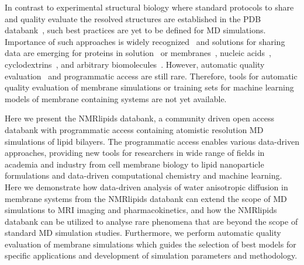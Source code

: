 \documentclass[fleqn,10pt]{wlscirep}
\begin{document}
In contrast to experimental structural biology where standard protocols to share and quality evaluate the resolved structures are established in the PDB databank~\cite{montelione13}, such best practices are yet to be defined for MD simulations. Importance of such approaches is widely recognized~\cite{feig99,tai04,silva06,abraham19,hildebrand19,hospital20,abriata20,espigares20} and solutions for sharing data are emerging for proteins in solution~\cite{meyer10,kamp10} or membranes~\cite{newport19,espigares20,leston22}, nucleic acids~\cite{hospital16}, cyclodextrins~\cite{mixcoha16}, and arbitrary biomolecules~\cite{bekker20}. However,
automatic quality evaluation~\cite{meyer10,hospital16} and programmatic access are still rare. 
Therefore, tools for automatic quality evaluation of membrane simulations or training sets for machine learning models of membrane containing systems are not yet available. 



Here we present the NMRlipids databank, a community driven open access databank with programmatic access containing atomistic resolution MD simulations of lipid bilayers. The programmatic access enables various data-driven approaches, providing new tools for researchers in wide range of fields in academia and industry from cell membrane biology to lipid nanoparticle formulations and data-driven computational chemistry and machine learning. Here we demonstrate how data-driven analysis of water anisotropic diffusion in membrane systems from the NMRlipids databank can extend the scope of MD simulations to MRI imaging and pharmacokinetics, and how the NMRlipids databank can be utilized to analyse rare phenomena that are beyond the scope of standard MD simulation studies. Furthermore, we perform automatic quality evaluation of membrane simulations which guides the selection of best models for specific applications and development of simulation parameters and methodology.
\end{document}

